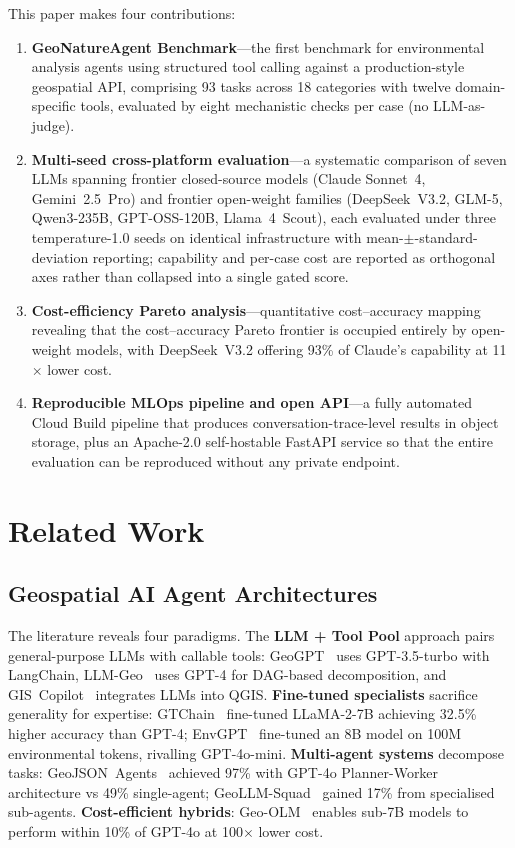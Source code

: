 \documentclass[10pt,twocolumn]{article}
\begin{document}
This paper makes four contributions:
\begin{enumerate}
\item \textbf{GeoNatureAgent Benchmark}---the first benchmark for environmental analysis agents using structured tool calling against a production-style geospatial API, comprising 93 tasks across 18 categories with twelve domain-specific tools, evaluated by eight mechanistic checks per case (no LLM-as-judge).
\item \textbf{Multi-seed cross-platform evaluation}---a systematic comparison of seven LLMs spanning frontier closed-source models (Claude Sonnet~4, Gemini~2.5~Pro) and frontier open-weight families (DeepSeek~V3.2, GLM-5, Qwen3-235B, GPT-OSS-120B, Llama~4~Scout), each evaluated under three temperature-1.0 seeds on identical infrastructure with mean-$\pm$-standard-deviation reporting; capability and per-case cost are reported as orthogonal axes rather than collapsed into a single gated score.
\item \textbf{Cost-efficiency Pareto analysis}---quantitative cost--accuracy mapping revealing that the cost--accuracy Pareto frontier is occupied entirely by open-weight models, with DeepSeek~V3.2 offering 93\% of Claude's capability at 11$\times$ lower cost.
\item \textbf{Reproducible MLOps pipeline and open API}---a fully automated Cloud Build pipeline that produces conversation-trace-level results in object storage, plus an Apache-2.0 self-hostable FastAPI service so that the entire evaluation can be reproduced without any private endpoint.
\end{enumerate}


\section{Related Work}
\label{sec:related}

\subsection{Geospatial AI Agent Architectures}

The literature reveals four paradigms. The \textbf{LLM + Tool Pool} approach pairs general-purpose LLMs with callable tools: GeoGPT~\citep{zhang2023geogpt} uses GPT-3.5-turbo with LangChain, LLM-Geo~\citep{li2023llmgeo} uses GPT-4 for DAG-based decomposition, and GIS~Copilot~\citep{akinboyewa2024giscopilot} integrates LLMs into QGIS. \textbf{Fine-tuned specialists} sacrifice generality for expertise: GTChain~\citep{zhang2024gtchain} fine-tuned LLaMA-2-7B achieving 32.5\% higher accuracy than GPT-4; EnvGPT~\citep{zhang2025envgpt} fine-tuned an 8B model on 100M environmental tokens, rivalling GPT-4o-mini. \textbf{Multi-agent systems} decompose tasks: GeoJSON~Agents~\citep{luo2025geojsonagents} achieved 97\% with GPT-4o Planner-Worker architecture vs 49\% single-agent; GeoLLM-Squad~\citep{lee2025geollmsquad} gained 17\% from specialised sub-agents. \textbf{Cost-efficient hybrids}: Geo-OLM~\citep{stamoulis2025geoolm} enables sub-7B models to perform within 10\% of GPT-4o at 100$\times$ lower cost.
\end{document}
